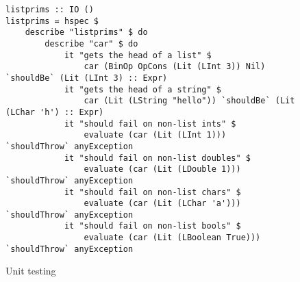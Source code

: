 \begin{landscape}
\begin{figure}
    \begin{verbatim}
listprims :: IO ()
listprims = hspec $ 
    describe "listprims" $ do
        describe "car" $ do
            it "gets the head of a list" $ 
                car (BinOp OpCons (Lit (LInt 3)) Nil) `shouldBe` (Lit (LInt 3) :: Expr)
            it "gets the head of a string" $
                car (Lit (LString "hello")) `shouldBe` (Lit (LChar 'h') :: Expr)
            it "should fail on non-list ints" $ 
                evaluate (car (Lit (LInt 1)))        `shouldThrow` anyException
            it "should fail on non-list doubles" $ 
                evaluate (car (Lit (LDouble 1)))     `shouldThrow` anyException
            it "should fail on non-list chars" $ 
                evaluate (car (Lit (LChar 'a')))     `shouldThrow` anyException
            it "should fail on non-list bools" $ 
                evaluate (car (Lit (LBoolean True))) `shouldThrow` anyException
    \end{verbatim}
    \caption{Unit testing}
\label{fig:unit}
\end{figure}
\end{landscape}

